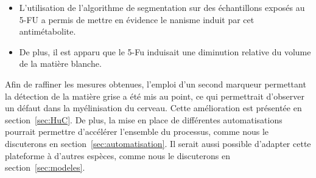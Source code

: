 \documentclass[\main/main.tex]{subfiles}
\begin{document}
\begin{itemize}
    \item
    L'utilisation de l'algorithme de segmentation sur des échantillons exposés au 5-FU
    a permis de mettre en évidence le nanisme induit par cet antimétabolite. 
    
    \item
    De plus, il est apparu que le 5-Fu induisait une diminution relative du volume de la matière blanche.
    
\end{itemize}

Afin de raffiner les mesures obtenues, l'emploi d'un second marqueur permettant la détection de la matière grise a été mis au point, ce qui permettrait d'observer un défaut dans la myélinisation du cerveau. Cette amélioration est présentée en section~\ref{sec:HuC}.
%
De plus, la mise en place de différentes automatisations pourrait permettre d'accélérer l'ensemble du processus, comme nous le discuterons en section~\ref{sec:automatisation}.
%
Il serait aussi possible d'adapter cette plateforme à d'autres espèces, comme nous le discuterons en section~\ref{sec:modeles}.
\end{document}
